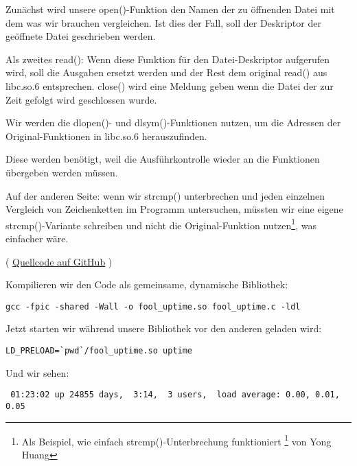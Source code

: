 Zunächst wird unsere open()-Funktion den Namen der zu öffnenden Datei mit dem was
wir brauchen vergleichen. Ist dies der Fall, soll der Deskriptor der geöffnete Datei
geschrieben werden.

Als zweites read(): Wenn diese Funktion für den Datei-Deskriptor aufgerufen wird,
soll die Ausgaben ersetzt werden und der Rest dem original read() aus libc.so.6
entsprechen.
close() wird eine Meldung geben wenn die Datei der zur Zeit gefolgt wird geschlossen
wurde.


Wir werden die dlopen()- und dlsym()-Funktionen nutzen, um die Adressen der Original-Funktionen
in libc.so.6 herauszufinden.

Diese werden benötigt, weil die Ausführkontrolle wieder an die  Funktionen
übergeben werden müssen.


Auf der anderen Seite: wenn wir strcmp() unterbrechen und jeden einzelnen Vergleich
von Zeichenketten im Programm untersuchen, müssten wir eine eigene strcmp()-Variante
schreiben und nicht die Original-Funktion
nutzen\footnote{Als Beispiel, wie einfach strcmp()-Unterbrechung funktioniert
\footnote{\href{http://go.yurichev.com/17143}{yurichev.com}} von Yong Huang}, was
einfacher wäre.


( \href{https://github.com/dennis714/RE-for-beginners/blob/master/OS/LD_PRELOAD/fool_uptime.c}{Quellcode auf GitHub} )

Kompilieren wir den Code als gemeinsame, dynamische Bibliothek:

\begin{lstlisting}
gcc -fpic -shared -Wall -o fool_uptime.so fool_uptime.c -ldl
\end{lstlisting}

Jetzt starten wir  während unsere Bibliothek vor den anderen geladen wird:

\begin{lstlisting}
LD_PRELOAD=`pwd`/fool_uptime.so uptime
\end{lstlisting}

Und wir sehen:

\begin{lstlisting}
 01:23:02 up 24855 days,  3:14,  3 users,  load average: 0.00, 0.01, 0.05
\end{lstlisting}


